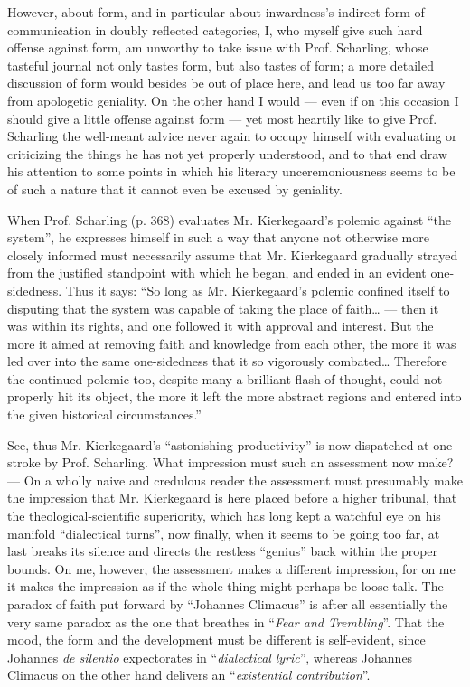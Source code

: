 \documentclass[12pt,a4paper,openany]{book}
\newcommand{\opage}[1]{\marginnote{\footnotesize\textit{[#1]}}}
\begin{document}
\setcounter{footnote}{0}%
\opage{14}However, about form, and in particular about inwardness's indirect
form of communication in doubly reflected categories,
I, who myself give such hard offense against form, am unworthy
to take issue with Prof. Scharling, whose tasteful
journal not only tastes form, but also tastes
of form; a more detailed discussion of form would besides
be out of place here, and lead us too far away from
apologetic geniality. On the other hand I would --- even if
on this occasion I should give a little offense against form
--- yet most heartily like to give Prof. Scharling the well-meant
advice never again to occupy himself with
evaluating or criticizing the things he has not yet properly
understood, and to that end draw his attention to some
points in which his literary unceremoniousness seems to be
of such a nature that it cannot even be excused by
geniality.

When Prof. Scharling (p. 368) evaluates Mr.
Kierkegaard's polemic against ``the system'', he expresses himself
in such a way that anyone not otherwise more closely
informed must necessarily assume that Mr. Kierkegaard
gradually strayed from the justified standpoint
with which he began, and ended in an evident
one-sidedness. Thus it says: ``So long as Mr.
Kierkegaard's polemic confined itself to disputing
that the system was capable of taking the place of faith\dots{} --- then it was within its rights, and one followed it with
approval and interest. But the more it aimed at
removing faith and knowledge from each other, the more it was led
\setcounter{footnote}{0}%
\opage{15}over into the same one-sidedness that it so vigorously combated\dots{} Therefore the continued polemic too, despite
many a brilliant flash of thought, could not properly hit its object,
the more it left the more abstract regions and
entered into the given historical circumstances.''

See, thus Mr. Kierkegaard's ``astonishing
productivity'' is now dispatched at one stroke by Prof. Scharling.
What impression must such an assessment now
make? --- On a wholly naive and credulous reader
the assessment must presumably make the impression that Mr. Kierkegaard
is here placed before a higher tribunal, that the theological-scientific
superiority, which has long kept a
watchful eye on his manifold ``dialectical turns'',
now finally, when it seems to be going too far, at last
breaks its silence and directs the restless ``genius'' back
within the proper bounds. On me, however, the assessment
makes a different impression, for on me it makes the
impression as if the whole thing might perhaps be loose talk.
The paradox of faith put forward by ``Johannes Climacus''
is after all essentially the very same paradox as the one that breathes
in ``\emph{Fear and Trembling}''. That the mood, the form and
the development must be different is self-evident, since
Johannes \textit{de silentio} expectorates in ``\emph{dialectical}
\emph{lyric}'', whereas Johannes Climacus on the other hand delivers an
``\emph{existential contribution}''.
\end{document}
